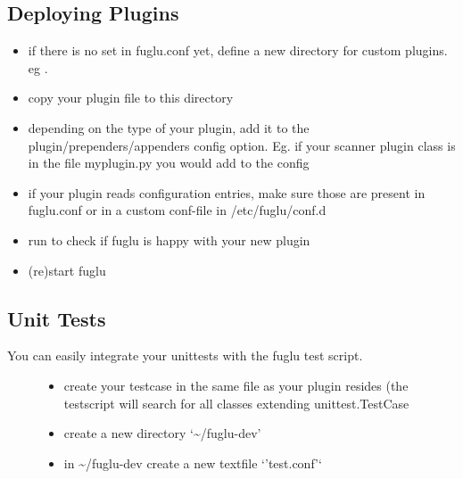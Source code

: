 \documentclass[letterpaper,10pt,english]{sphinxmanual}
\begin{document}
\subsection{Deploying Plugins}
\label{plugins-index:deploying-plugins}\begin{itemize}
\item {} 
if there is no  set in fuglu.conf yet, define a new directory for custom plugins. eg .

\item {} 
copy your plugin file to this directory

\item {} 
depending on the type of your plugin, add it to the plugin/prependers/appenders config option. Eg. if your scanner plugin class is  in the file myplugin.py you would add  to the  config

\item {} 
if your plugin reads configuration entries, make sure those are present in fuglu.conf or in a custom conf-file in /etc/fuglu/conf.d

\item {} 
run  to check if fuglu is happy with your new plugin

\item {} 
(re)start fuglu

\end{itemize}


\subsection{Unit Tests}
\label{plugins-index:unit-tests}\begin{description}
\item[{You can easily integrate your unittests with the fuglu test script.}] \leavevmode\begin{itemize}
\item {} 
create your testcase in the same file as your plugin resides (the testscript will search for all classes extending unittest.TestCase

\item {} 
create a new directory `\textasciitilde{}/fuglu-dev'

\item {} 
in \textasciitilde{}/fuglu-dev create a new textfile `'test.conf'`

\end{itemize}

\end{description}
\end{document}
